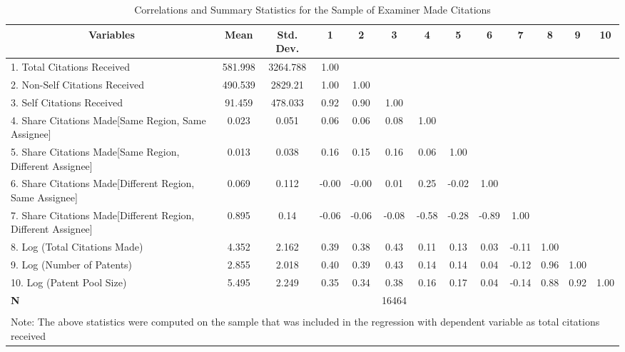 \begin{sidewaystable}[htbp] \centering \caption{Correlations and Summary Statistics for the Sample of Examiner Made Citations \label{e.tcorrelation}}
\footnotesize
\onehalfspacing
\begin{tabular}{l  c  c  c  c  c  c  c  c  c  c  c  c }\hline\hline
\multicolumn{1}{c}{Variables} & \textbf{Mean}& \textbf{Std. Dev.}&1&2&3&4&5&6&7&8&9&10\\ \hline 
1. Total Citations Received& 581.998 & 3264.788&1.00\\
2. Non-Self Citations Received& 490.539 & 2829.21&1.00&1.00\\
3. Self Citations Received& 91.459 & 478.033&0.92&0.90&1.00\\
4. Share Citations Made[Same Region, Same Assignee]& 0.023 & 0.051&0.06&0.06&0.08&1.00\\
5. Share Citations Made[Same Region, Different Assignee]& 0.013 & 0.038&0.16&0.15&0.16&0.06&1.00\\
6. Share Citations Made[Different Region, Same Assignee] & 0.069 & 0.112&-0.00&-0.00&0.01&0.25&-0.02&1.00\\
7. Share Citations Made[Different Region, Different Assignee]& 0.895 & 0.14&-0.06&-0.06&-0.08&-0.58&-0.28&-0.89&1.00\\
8. Log (Total Citations Made)& 4.352 & 2.162&0.39&0.38&0.43&0.11&0.13&0.03&-0.11&1.00\\
9. Log (Number of Patents)& 2.855 & 2.018&0.40&0.39&0.43&0.14&0.14&0.04&-0.12&0.96&1.00\\
10. Log (Patent Pool Size)& 5.495 & 2.249&0.35&0.34&0.38&0.16&0.17&0.04&-0.14&0.88&0.92&1.00\\
\hline
\textbf{N}&&&&&16464\\
\hline \hline \\
\multicolumn{13}{l}{\footnotesize Note: The above statistics were computed on the sample that was included in the regression with dependent variable as total citations received}\\
 \end{tabular}
\end{sidewaystable}
